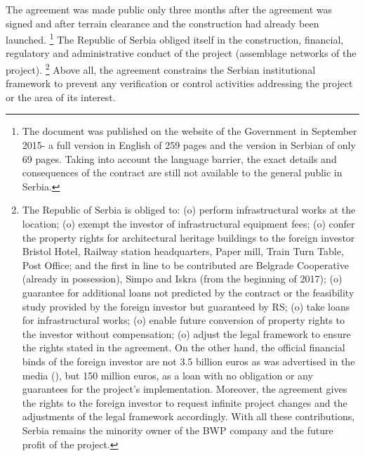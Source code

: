 \documentclass[11pt]{report}
\begin{document}
{{{{The  agreement  was  made  public  only  three  months  after  the  agreement  was  signed  and after terrain  clearance  and  the  construction  had  already been  launched.
\footnote{The document  was published on the website of the Government in September 2015- a full version in English of 259 pages and the version in Serbian of only 69 pages. Taking into account the language barrier, the exact details and consequences of the contract are still not available to the general public in Serbia.}
The Republic of Serbia obliged itself in the construction, financial, regulatory and administrative conduct of the project (assemblage networks of the project).
\footnote{The Republic of Serbia is obliged to: (o) perform infrastructural works at the location; (o) exempt the investor of infrastructural equipment fees; (o) confer the property rights for architectural heritage buildings to the foreign investor Bristol Hotel, Railway station headquarters, Paper mill, Train Turn Table, Post Office; and the first in line to be contributed are Belgrade Cooperative (already in possession), Simpo and Iskra (from the beginning of 2017); (o) guarantee for additional loans not predicted by the contract or the feasibility study provided by the foreign investor but guaranteed by RS; (o) take loans for infrastructural works; (o) enable future conversion of property rights to the investor without compensation; (o) adjust the legal framework to ensure the rights stated in the agreement. On the other hand, the official financial binds of the foreign investor are not 3.5 billion euros as was advertised in the media  (\href{Politika}{\citealt{politika_zemljiste_2015}}), but 150 million euros, as a loan with no obligation or any guarantees for the project’s implementation. Moreover, the agreement gives the rights to the foreign investor to request infinite project changes and the adjustments of the legal framework accordingly. With all these contributions, Serbia remains
the minority owner of the BWP company and the future profit of the project.}
Above all, the agreement constrains the Serbian institutional framework to prevent any verification or control activities addressing the project or the area of its interest.
\\

}}}}
\end{document}
